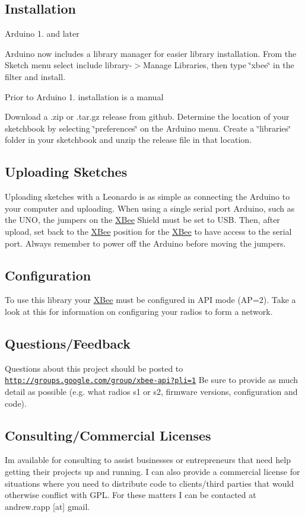 \subsection*{Installation}

Arduino 1. and later

Arduino now includes a library manager for easier library installation. From the Sketch menu select include library-\/$>$Manage Libraries, then type \char`\"{}xbee\char`\"{} in the filter and install.

Prior to Arduino 1. installation is a manual

Download a .zip or .tar.\+gz release from github. Determine the location of your sketchbook by selecting \char`\"{}preferences\char`\"{} on the Arduino menu. Create a \char`\"{}libraries\char`\"{} folder in your sketchbook and unzip the release file in that location.

\subsection*{Uploading Sketches}

Uploading sketches with a Leonardo is as simple as connecting the Arduino to your computer and uploading. When using a single serial port Arduino, such as the U\+NO, the jumpers on the \hyperlink{class_x_bee}{X\+Bee} Shield must be set to U\+SB. Then, after upload, set back to the \hyperlink{class_x_bee}{X\+Bee} position for the \hyperlink{class_x_bee}{X\+Bee} to have access to the serial port. Always remember to power off the Arduino before moving the jumpers.

\subsection*{Configuration}

To use this library your \hyperlink{class_x_bee}{X\+Bee} must be configured in A\+PI mode (AP=2). Take a look at this for information on configuring your radios to form a network.

\subsection*{Questions/\+Feedback}

Questions about this project should be posted to \href{http://groups.google.com/group/xbee-api?pli=1}{\tt http\+://groups.\+google.\+com/group/xbee-\/api?pli=1} Be sure to provide as much detail as possible (e.\+g. what radios s1 or s2, firmware versions, configuration and code).

\subsection*{Consulting/\+Commercial Licenses}

I\textquotesingle{}m available for consulting to assist businesses or entrepreneurs that need help getting their projects up and running. I can also provide a commercial license for situations where you need to distribute code to clients/third parties that would otherwise conflict with G\+PL. For these matters I can be contacted at andrew.\+rapp \mbox{[}at\mbox{]} gmail. 